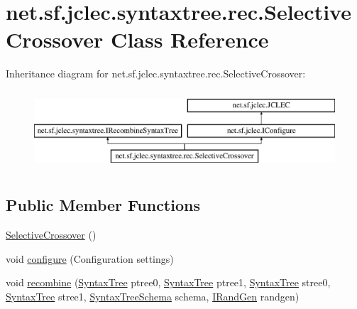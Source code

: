 \hypertarget{classnet_1_1sf_1_1jclec_1_1syntaxtree_1_1rec_1_1_selective_crossover}{\section{net.\-sf.\-jclec.\-syntaxtree.\-rec.\-Selective\-Crossover Class Reference}
\label{classnet_1_1sf_1_1jclec_1_1syntaxtree_1_1rec_1_1_selective_crossover}
}
Inheritance diagram for net.\-sf.\-jclec.\-syntaxtree.\-rec.\-Selective\-Crossover\-:\begin{figure}[H]
\begin{center}
\leavevmode
\includegraphics[height=2.978723cm]{classnet_1_1sf_1_1jclec_1_1syntaxtree_1_1rec_1_1_selective_crossover}
\end{center}
\end{figure}
\subsection*{Public Member Functions}
\begin{DoxyCompactItemize}
\item 
\hyperlink{classnet_1_1sf_1_1jclec_1_1syntaxtree_1_1rec_1_1_selective_crossover_af437026178db66092bd5cfc4400659da}{Selective\-Crossover} ()
\item 
void \hyperlink{classnet_1_1sf_1_1jclec_1_1syntaxtree_1_1rec_1_1_selective_crossover_a2a02b77eeaf2a526cf113d9716e0d8d7}{configure} (Configuration settings)
\item 
void \hyperlink{classnet_1_1sf_1_1jclec_1_1syntaxtree_1_1rec_1_1_selective_crossover_a429461ee2850c879657b0dab2e800bb9}{recombine} (\hyperlink{classnet_1_1sf_1_1jclec_1_1syntaxtree_1_1_syntax_tree}{Syntax\-Tree} ptree0, \hyperlink{classnet_1_1sf_1_1jclec_1_1syntaxtree_1_1_syntax_tree}{Syntax\-Tree} ptree1, \hyperlink{classnet_1_1sf_1_1jclec_1_1syntaxtree_1_1_syntax_tree}{Syntax\-Tree} stree0, \hyperlink{classnet_1_1sf_1_1jclec_1_1syntaxtree_1_1_syntax_tree}{Syntax\-Tree} stree1, \hyperlink{classnet_1_1sf_1_1jclec_1_1syntaxtree_1_1_syntax_tree_schema}{Syntax\-Tree\-Schema} schema, \hyperlink{interfacenet_1_1sf_1_1jclec_1_1util_1_1random_1_1_i_rand_gen}{I\-Rand\-Gen} randgen)
\end{DoxyCompactItemize}
